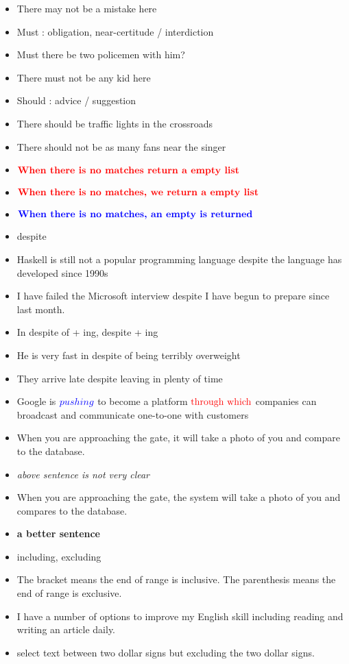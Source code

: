 \documentclass{article}
\begin{document}
\begin{itemize}
\item[] There may not be a mistake here
\item Must : obligation, near-certitude / interdiction
\item[] Must there be two policemen with him?
\item[] There must not be any kid here
\item Should : advice / suggestion
\item[] There should be traffic lights in the crossroads
\item[] There should not be as many fans near the singer
\item $\color{red}{\textbf{When there is no matches return a empty list}}$
\item $\color{red}{\textbf{When there is no matches, we return a empty list}}$
\item $\color{blue}{\textbf{When there is no matches, an empty is returned}}$
\end{itemize}

\begin{itemize}
\item despite 
\item[] Haskell is still not a popular programming language despite the language has developed since 1990s
\item I have failed the Microsoft interview despite I have begun to prepare since last month. 
\item In despite of + ing,  despite + ing
\item[] He is very fast in despite of being terribly overweight 
\item[] They arrive late despite leaving in plenty of time  
\item Google is $\color{blue}{pushing}$ to become a platform $\color{red}{\mbox{through which}}$ companies can broadcast and communicate one-to-one with customers
\item When you are approaching the gate, it will take a photo of you and compare to the database.
\item[] \textit{above sentence is not very clear}
\item When you are approaching the gate, the system will take a photo of you and compares to the database.
\item[] \textbf{a better sentence}
\item including, excluding
\item[] The bracket means the end of range is inclusive. The parenthesis means the end of range is exclusive.
\item[] I have a number of options to improve my English skill including reading and writing an article daily.
\item[] select text between two dollar signs but excluding the two dollar signs.
\end{itemize}
\end{document}
